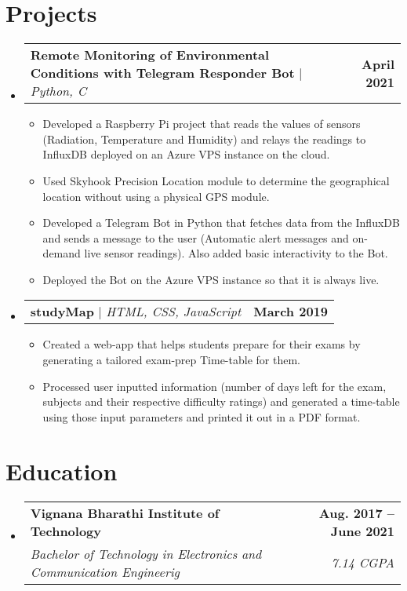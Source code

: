 \documentclass[letterpaper,11pt]{article}
\makeatletter
\newcommand{\resumeItem}[1]{
  \item\small{
    {#1 \vspace{-2pt}}
  }
}
\newcommand{\resumeSubheading}[4]{
  \vspace{-2pt}\item
    \begin{tabular*}{1.0\textwidth}[t]{l@{\extracolsep{\fill}}r}
      \textbf{#1} & \textbf{\small #2} \\
      \textit{\small#3} & \textit{\small #4} \\
    \end{tabular*}\vspace{-7pt}
}
\newcommand{\resumeProjectHeading}[2]{
    \item
    \begin{tabular*}{1.001\textwidth}{l@{\extracolsep{\fill}}r}
      \small#1 & \textbf{\small #2}\\
    \end{tabular*}\vspace{-7pt}
}
\newcommand{\resumeSubHeadingListStart}{\begin{itemize}[leftmargin=0.0in, label={}]}
\newcommand{\resumeSubHeadingListEnd}{\end{itemize}}
\newcommand{\resumeItemListStart}{\begin{itemize}}
\newcommand{\resumeItemListEnd}{\end{itemize}\vspace{-5pt}}
\makeatother
\begin{document}
\section{Projects}
    \vspace{-5pt}
    \resumeSubHeadingListStart
      \resumeProjectHeading
          {\textbf{Remote Monitoring of Environmental Conditions with Telegram Responder Bot} $|$ \emph{Python, C}}{April 2021}
          \resumeItemListStart
            \resumeItem{Developed a Raspberry Pi project that reads the values of sensors (Radiation, Temperature and Humidity) and relays the readings to InfluxDB deployed on an Azure VPS instance on the cloud.}
            \resumeItem{Used Skyhook Precision Location module to determine the geographical location without using a physical GPS module.}
            \resumeItem{Developed a Telegram Bot in Python that fetches data from the InfluxDB and sends a message to the user (Automatic alert messages and on-demand live sensor readings). Also added basic interactivity to the Bot.}
            \resumeItem{Deployed the Bot on the Azure VPS instance so that it is always live.}
          \resumeItemListEnd
          \vspace{-13pt}
      \resumeProjectHeading
          {\textbf{studyMap} $|$ \emph{HTML, CSS, JavaScript}}{March 2019}
          \resumeItemListStart
            \resumeItem{Created a web-app that helps students prepare for their exams by generating a tailored exam-prep Time-table for them.}
            \resumeItem{Processed user inputted information (number of days left for the exam, subjects and their respective difficulty ratings) and generated a time-table using those input parameters and printed it out in a PDF format.}
          \resumeItemListEnd
          \vspace{-13pt}
    \resumeSubHeadingListEnd
\vspace{1pt}

\section{Education}
  \resumeSubHeadingListStart
    \resumeSubheading
      {Vignana Bharathi Institute of Technology}{Aug. 2017 -- June 2021}
      {Bachelor of Technology in Electronics and Communication Engineerig}{7.14 CGPA}
  \resumeSubHeadingListEnd
\end{document}
